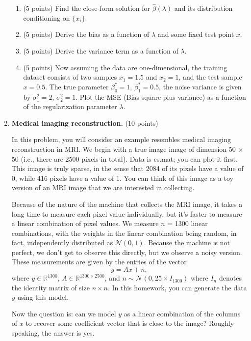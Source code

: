 \documentclass[twoside,10pt]{article}
\begin{document}
\begin{enumerate}
\begin{enumerate}
\item (5 points) Find the close-form solution for $\widehat {\beta}(\lambda)$ and its distribution conditioning on $\{x_i\}$.

\item (5 points) Derive the bias as a function of $\lambda$ and some fixed test point $x$.

\item (5 points) Derive the variance term as a function of $\lambda$.

\item (5 points) Now assuming the data are one-dimensional, the training dataset consists of two samples $x_1 = 1.5$ and $x_2 = 1$,  and the test sample $x = 0.5$. The true parameter $\beta_0^* = 1$, $\beta_1^* = 0.5$, the noise variance is given by $\sigma_1^2 = 2$, $\sigma_2^2 = 1$. Plot the MSE (Bias square plus variance) as a function of the regularization parameter $\lambda$. 

\end{enumerate} 


\clearpage
\item {\bf Medical imaging reconstruction.} (10 points)

In this problem, you will consider an example resembles medical imaging reconstruction in MRI.  We begin with a true image image of dimension 50 $\times$ 50 (i.e., there are 2500 pixels in total). Data is \textsf{cs.mat}; you can plot it first. This image is truly sparse, in the sense that 2084 of its pixels have a value of 0, while 416 pixels have a value of 1. You can think of this image as a toy version of an MRI image that we are interested in collecting.

Because of the nature of the machine that collects the MRI image, it takes a long time to measure each pixel value individually, but it's faster to measure a linear combination of pixel values. We measure $n$ = 1300 linear combinations, with the weights in the linear combination being random, in fact, independently distributed as $\mathcal{N}(0,1)$. Because the machine is not perfect, we don't get to observe this directly, but we observe a noisy version. These measurements are given by the entries of the vector
\[
y = A x + n,
\]
where $y \in \mathbb R^{1300}$, $A \in \mathbb R^{1300\times 2500}$, and $n \sim \mathcal N(0, 25\times I_{1300})$ where $I_n$ denotes the identity matrix of size $n\times n$. In this homework, you can generate the data $y$ using this model. 

Now the question is: can we model $y$ as a linear combination of the columns of $x$ to recover some coefficient vector that is close to the image? Roughly speaking, the answer is yes. 


\end{enumerate}
\end{document}
